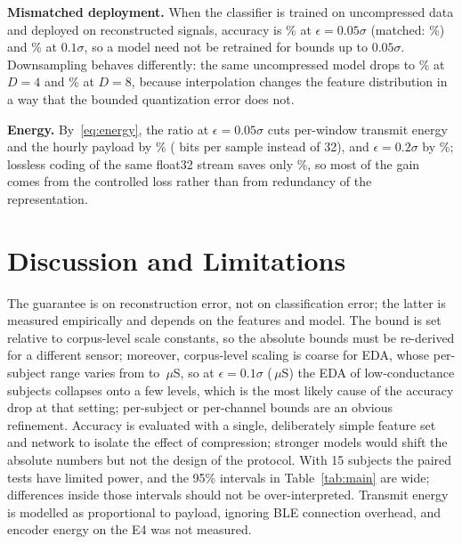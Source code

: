 \documentclass[conference]{IEEEtran}
\begin{document}
\textbf{Mismatched deployment.} When the classifier is trained on uncompressed data and deployed on reconstructed signals, accuracy is \accMMEd\% at $\epsilon=0.05\sigma$ (matched: \accEd\%) and \accMMEe\% at $0.1\sigma$, so a model need not be retrained for bounds up to $0.05\sigma$. Downsampling behaves differently: the same uncompressed model drops to \dsAccMMC\% at $D=4$ and \dsAccMME\% at $D=8$, because interpolation changes the feature distribution in a way that the bounded quantization error does not.

\textbf{Energy.} By~\eqref{eq:energy}, the ratio at $\epsilon=0.05\sigma$ cuts per-window transmit energy and the hourly payload by \savingEd\% (\bpsEd{} bits per sample instead of 32), and $\epsilon=0.2\sigma$ by \savingEf\%; lossless coding of the same float32 stream saves only \savingLossless\%, so most of the gain comes from the controlled loss rather than from redundancy of the representation.

\section{Discussion and Limitations}
The guarantee is on reconstruction error, not on classification error; the latter is measured empirically and depends on the features and model. The bound is set relative to corpus-level scale constants, so the absolute bounds must be re-derived for a different sensor; moreover, corpus-level scaling is coarse for EDA, whose per-subject range varies from \minEDARange{} to \maxEDARange\,$\mu$S, so at $\epsilon=0.1\sigma$ (\epsEDAEe\,$\mu$S) the EDA of low-conductance subjects collapses onto a few levels, which is the most likely cause of the accuracy drop at that setting; per-subject or per-channel bounds are an obvious refinement. Accuracy is evaluated with a single, deliberately simple feature set and network to isolate the effect of compression; stronger models would shift the absolute numbers but not the design of the protocol. With 15 subjects the paired tests have limited power, and the 95\% intervals in Table~\ref{tab:main} are wide; differences inside those intervals should not be over-interpreted. Transmit energy is modelled as proportional to payload, ignoring BLE connection overhead, and encoder energy on the E4 was not measured.
\end{document}
